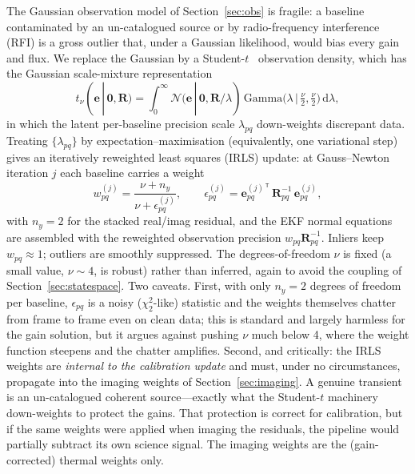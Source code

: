 \documentclass[11pt]{article}
\newcommand{\Norm}{\mathcal{N}}
\newcommand{\T}{^{\mathsf{T}}}
\newcommand{\given}{\,|\,}
\newcommand{\dd}{\mathrm{d}}
\begin{document}
The Gaussian observation model of Section~\ref{sec:obs} is fragile: a baseline contaminated by an
un-catalogued source or by radio-frequency interference (RFI) is a gross outlier that, under a
Gaussian likelihood, would bias every gain and flux. We replace the Gaussian by a Student-$t$~\cite{studentt}
observation density, which has the Gaussian scale-mixture representation
\begin{equation}
  t_\nu(\bm{e}\given \bm 0,\bm{R}) = \int_0^\infty \Norm(\bm{e}\given\bm 0,\bm{R}/\lambda)\,
  \mathrm{Gamma}\!\big(\lambda\given\tfrac\nu2,\tfrac\nu2\big)\,\dd\lambda,
\end{equation}
in which the latent per-baseline precision scale $\lambda_{pq}$ down-weights discrepant data.
Treating $\{\lambda_{pq}\}$ by expectation--maximisation (equivalently, one variational step) gives
an iteratively reweighted least squares (IRLS) update: at Gauss--Newton iteration $j$ each baseline
carries a weight
\begin{equation}
  w_{pq}^{(j)} = \frac{\nu+n_y}{\nu + \epsilon_{pq}^{(j)}},
  \qquad
  \epsilon_{pq}^{(j)} = \bm{e}_{pq}^{(j)\,\T}\,\bm{R}_{pq}^{-1}\,\bm{e}_{pq}^{(j)},
\end{equation}
with $n_y=2$ for the stacked real/imag residual, and the EKF normal equations are assembled with the
reweighted observation precision $w_{pq}\bm{R}_{pq}^{-1}$. Inliers keep $w_{pq}\!\approx\!1$;
outliers are smoothly suppressed. The degrees-of-freedom $\nu$ is fixed (a small value, $\nu\sim4$,
is robust) rather than inferred, again to avoid the coupling of Section~\ref{sec:statespace}.
Two caveats. First, with only $n_y=2$ degrees of freedom per baseline, $\epsilon_{pq}$ is a noisy
($\chi^2_2$-like) statistic and the weights themselves chatter from frame to frame even on clean
data; this is standard and largely harmless for the gain solution, but it argues against pushing
$\nu$ much below 4, where the weight function steepens and the chatter amplifies. Second, and
critically: the IRLS weights are \emph{internal to the calibration update} and must, under no
circumstances, propagate into the imaging weights of Section~\ref{sec:imaging}. A genuine transient
is an un-catalogued coherent source---exactly what the Student-$t$ machinery down-weights to protect
the gains. That protection is correct for calibration, but if the same weights were applied when
imaging the residuals, the pipeline would partially subtract its own science signal. The imaging
weights are the (gain-corrected) thermal weights only.
\end{document}
